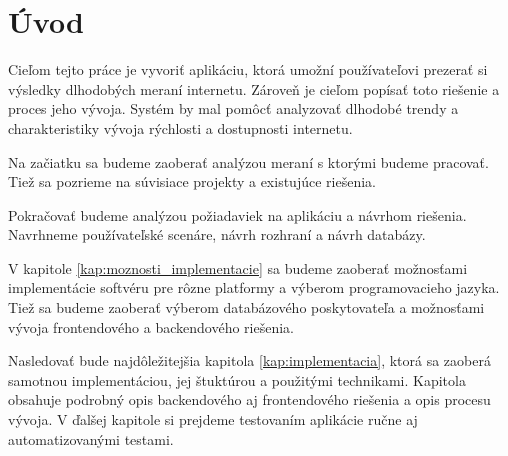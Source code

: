 \chapter*{Úvod} %

Cieľom tejto práce je vyvoriť aplikáciu, ktorá umožní používateľovi prezerať si výsledky dlhodobých meraní internetu.
Zároveň je cieľom popísať toto riešenie a proces jeho vývoja. Systém by mal pomôcť analyzovať dlhodobé trendy a charakteristiky 
vývoja rýchlosti a dostupnosti internetu.

Na začiatku sa budeme zaoberať analýzou meraní s ktorými budeme pracovať. Tiež sa pozrieme na súvisiace projekty
a existujúce riešenia. 

Pokračovať budeme analýzou požiadaviek na aplikáciu a návrhom riešenia. Navrhneme používateľské scenáre, návrh rozhraní 
a návrh databázy.

V kapitole \ref{kap:moznosti_implementacie} sa budeme zaoberať možnosťami implementácie softvéru pre rôzne platformy a výberom programovacieho jazyka. 
Tiež sa budeme zaoberať výberom databázového poskytovateľa a možnosťami vývoja frontendového a backendového riešenia.

Nasledovať bude najdôležitejšia kapitola \ref{kap:implementacia}, ktorá sa zaoberá samotnou implementáciou, jej štuktúrou a použitými technikami.
Kapitola obsahuje podrobný opis backendového aj frontendového riešenia a opis procesu vývoja. V ďalšej kapitole si prejdeme testovaním aplikácie 
ručne aj automatizovanými testami.
 
